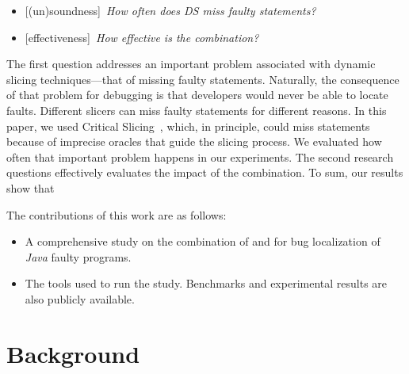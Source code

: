 \documentclass[sigplan,10pt,review,anonymous]{acmart}\settopmatter{printfolios=true,printccs=false,printacmref=false}
\begin{document}

\newcommand{\rqone}{How often does DS miss faulty statements?}
\newcommand{\rqthree}{How effective is the \comb{} combination?}

\begin{itemize}[leftmargin=*]
\item[]{\footnotesize[(un)soundness]}~\textit{\rqone{}}
\item[]{\footnotesize[effectiveness]}~\textit{\rqthree{}}  
\end{itemize}

The first question addresses an important problem associated with
dynamic slicing techniques---that of missing faulty
statements. Naturally, the consequence of that problem for debugging
is that developers would never be able to locate faults. Different
slicers can miss faulty statements for different reasons. In this
paper, we used Critical Slicing~\cite{DeMillo:1996:CSS:229000.226310},
which, in principle, could miss statements because of imprecise
oracles that guide the slicing process. We evaluated how often that
important problem happens in our experiments. The second research
questions effectively evaluates the impact of the combination. To sum,
our results show that 

The contributions of this work are as follows:
\begin{itemize}
	\item A comprehensive study on the combination of \sfl{} and \ds{}
     for bug localization of \emph{Java} faulty programs.
	\item The tools used to run the study. Benchmarks and experimental results are also publicly available.
\end{itemize}


\newpage

\section{Background}
\label{sec:background}
\end{document}
